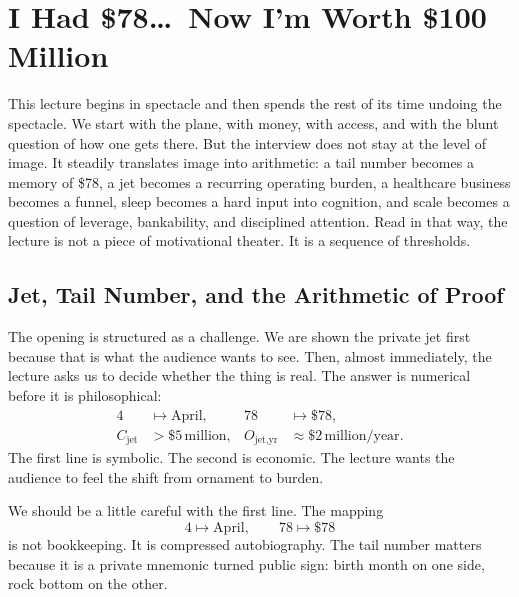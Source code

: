 \chapter{I Had \$78\ldots\ Now I'm Worth \$100 Million}

This lecture begins in spectacle and then spends the rest of its time undoing the spectacle. We start with the plane, with money, with access, and with the blunt question of how one gets there. But the interview does not stay at the level of image. It steadily translates image into arithmetic: a tail number becomes a memory of \$78, a jet becomes a recurring operating burden, a healthcare business becomes a funnel, sleep becomes a hard input into cognition, and scale becomes a question of leverage, bankability, and disciplined attention. Read in that way, the lecture is not a piece of motivational theater. It is a sequence of thresholds.

\section{Jet, Tail Number, and the Arithmetic of Proof}

The opening is structured as a challenge. We are shown the private jet first because that is what the audience wants to see. Then, almost immediately, the lecture asks us to decide whether the thing is real. The answer is numerical before it is philosophical:
\begin{align}
4 &\mapsto \text{April}, &
78 &\mapsto \$78, \\
C_{\text{jet}} &> \$5\,\text{million}, &
O_{\text{jet,yr}} &\approx \$2\,\text{million/year}.
\end{align}
The first line is symbolic. The second is economic. The lecture wants the audience to feel the shift from ornament to burden.

We should be a little careful with the first line. The mapping
\[
4 \mapsto \text{April}, \qquad 78 \mapsto \$78
\]
is not bookkeeping. It is compressed autobiography. The tail number matters because it is a private mnemonic turned public sign: birth month on one side, rock bottom on the other.

